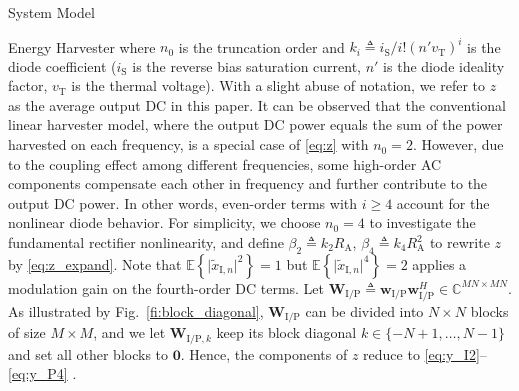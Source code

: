 \documentclass[journal]{IEEEtran}
\begin{document}
\begin{section}{System Model}
\begin{subsection}{Energy Harvester}
			where $n_0$ is the truncation order and $k_i \triangleq i_{\mathrm{S}}/i!(n'v_{\mathrm{T}})^i$ is the diode coefficient ($i_{\mathrm{S}}$ is the reverse bias saturation current, $n'$ is the diode ideality factor, $v_{\mathrm{T}}$ is the thermal voltage). With a slight abuse of notation, we refer to $z$ as the average output DC in this paper. It can be observed that the conventional linear harvester model, where the output DC power equals the sum of the power harvested on each frequency, is a special case of \eqref{eq:z} with $n_0=2$. However, due to the coupling effect among different frequencies, some high-order AC components compensate each other in frequency and further contribute to the output DC power. In other words, even-order terms with $i \ge 4$ account for the nonlinear diode behavior. For simplicity, we choose $n_0=4$ to investigate the fundamental rectifier nonlinearity, and define $\beta_2 \triangleq {k_2}{R_{\mathrm{A}}}$, $\beta_4 \triangleq {k_4}{R_{\mathrm{A}}^2}$ to rewrite $z$ by \eqref{eq:z_expand}. Note that $\mathbb{E}\left\{\lvert\tilde{x}_{\mathrm{I},n}\rvert^2\right\}=1$ but $\mathbb{E}\left\{\lvert\tilde{x}_{\mathrm{I},n}\rvert^4\right\}=2$ applies a modulation gain on the fourth-order DC terms. Let $\boldsymbol{W}_{\mathrm{I/P}} \triangleq \boldsymbol{w}_{\mathrm{I/P}}\boldsymbol{w}_{\mathrm{I/P}}^H \in \mathbb{C}^{MN \times MN}$. As illustrated by Fig.~\ref{fi:block_diagonal}, $\boldsymbol{W}_{\mathrm{I/P}}$ can be divided into $N \times N$ blocks of size $M \times M$, and we let $\boldsymbol{W}_{\mathrm{I/P},k}$ keep its block diagonal $k \in \{-N+1,\dots,N-1\}$ and set all other blocks to $\boldsymbol{0}$. Hence, the components of $z$ reduce to \eqref{eq:y_I2}--\eqref{eq:y_P4} \cite{Golub2013}.


\end{subsection}
\end{section}
\end{document}
